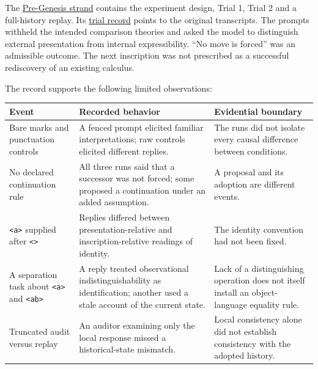 \documentclass[
  11pt,
]{article}
\begin{document}
The \href{docs/sources/pre_genesis/readme.txt}{Pre-Genesis strand}
contains the experiment design, Trial 1, Trial 2 and a full-history
replay. Its \href{docs/sources/pre_genesis/02_trial_record.txt}{trial
record} points to the original transcripts. The prompts withheld the
intended comparison theories and asked the model to distinguish external
presentation from internal expressibility. ``No move is forced'' was an
admissible outcome. The next inscription was not prescribed as a
successful rediscovery of an existing calculus.

The record supports the following limited observations:

\begin{longtable}[]{@{}
  >{\raggedright\arraybackslash}p{}
  >{\raggedright\arraybackslash}p{}
  >{\raggedright\arraybackslash}p{}@{}}
\toprule\noalign{}
\begin{minipage}[b]{\linewidth}\raggedright
Event
\end{minipage} & \begin{minipage}[b]{\linewidth}\raggedright
Recorded behavior
\end{minipage} & \begin{minipage}[b]{\linewidth}\raggedright
Evidential boundary
\end{minipage} \\
\midrule\noalign{}
\endhead
\bottomrule\noalign{}
\endlastfoot
Bare marks and punctuation controls & A fenced prompt elicited familiar
interpretations; raw controls elicited different replies. & The runs did
not isolate every causal difference between conditions. \\
No declared continuation rule & All three runs said that a successor was
not forced; some proposed a continuation under an added assumption. & A
proposal and its adoption are different events. \\
\texttt{\textless{}a\textgreater{}} supplied after
\texttt{\textless{}\textgreater{}} & Replies differed between
presentation-relative and inscription-relative readings of identity. &
The identity convention had not been fixed. \\
A separation task about \texttt{\textless{}a\textgreater{}} and
\texttt{\textless{}ab\textgreater{}} & A reply treated observational
indistinguishability as identification; another used a stale account of
the current state. & Lack of a distinguishing operation does not itself
install an object-language equality rule. \\
Truncated audit versus replay & An auditor examining only the local
response missed a historical-state mismatch. & Local consistency alone
did not establish consistency with the adopted history. \\
\end{longtable}
\end{document}
